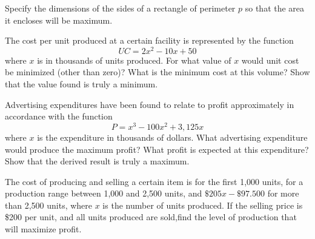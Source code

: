 \begin{exercises}
    \begin{exercise}
    \label{sea-9-1}
        Specify the dimensions of the sides of a rectangle of perimeter $p$ so that the area it encloses will be maximum.
    \end{exercise}
    \begin{solution}
    \end{solution}
    
    \begin{exercise}
    \label{sea-9-2}
        The cost per unit produced at a certain facility is represented by the function
        \begin{equation}
            UC = 2x^2-10x+50
        \end{equation}
        where $x$ is in thousands of units produced. For what value of $x$ would unit cost be minimized (other than zero)? What is the minimum cost at this volume? Show that the value found is truly a minimum.
    \end{exercise}
    \begin{solution}
    \end{solution}
    
    \begin{exercise}
    \label{sea-9-3}
        Advertising expenditures have been found to relate to profit approximately in accordance with the function
        \begin{equation}
            P = x^3-100x^2+3,125x
        \end{equation}
        where $x$ is the expenditure in thousands of dollars. What advertising expenditure would produce the maximum profit? What profit is expected at this expenditure? Show that the derived result is truly a maximum.
    \end{exercise}
    \begin{solution}
    \end{solution}
    
    \begin{exercise}
    \label{sea-9-4}
        The cost of producing and selling a certain item is for the first 1,000 units, for a production range between 1,000 and 2,500 units, and $\$205x-\$97.500$ for more than 2,500 units, where $x$ is the number of units produced. If the selling price is \$200 per unit, and all units produced are sold,find the level of production that will maximize profit.
    \end{exercise}
    \begin{solution}
    \end{solution}
    

\end{exercises}
